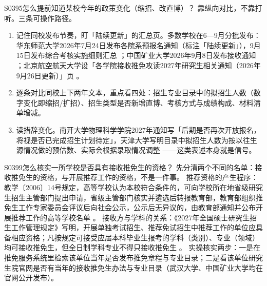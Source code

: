\begin{qa}{S0395}{怎么提前知道某校今年的政策变化（缩招、改直博）？}
靠纵向对比，不靠打听。三条可操作路径。
\begin{enumerate}
  \item 记住同校发布节奏，盯「陆续更新」的汇总页。多数学校在6—9月分批发布：华东师范大学2026年7月24日发布各院系预报名通知（标注「陆续更新」），9月15日发布综合考核实施细则汇总 ；中国矿业大学2026年9月8日发布接收通知 ；北京航空航天大学设「各学院接收推免攻读2027年研究生相关通知（2026年9月26日更新）」页 。
  \item 逐条对比同校上下两年文本，重点看四处：招生专业目录中的拟招生人数（数字变化即缩招/扩招）、招生类型是否新增直博、考核方式与成绩构成、材料清单增减。
  \item 读措辞变化。南开大学物理科学学院2027年通知写「后期是否再次开放报名，将视是否已完成招生计划待定」，天津大学写明目录中拟招生人数为按以往生源情况做的预估数、实际会根据录取情况调整 ——这类表述本身就是信号。
\end{enumerate}
\end{qa}

\begin{qa}{S0399}{怎么核实一所学校是否具有接收推免生的资格？}
先分清两个不同的名单：接收推免生的资格，与开展推荐工作的资格，不是一件事。
推荐资格的产生程序：教学〔2006〕14号规定，高等学校认为本校符合条件的，可向学校所在地省级研究生招生主管部门提出申请，省级主管部门核实并遴选后转报教育部，教育部组织推免生工作专家委员会评议后向社会公示，公示后无异议的，由教育部通知并公布开展推荐工作的高等学校名单 。
接收方与学科的关系：《2027年全国硕士研究生招生工作管理规定》写明，开展单独考试招生、推荐免试招生中推荐工作的单位应具备相应资格；凡按规定可接受应届本科毕业生报考的学科（类别）、专业（领域）均可接收推免生，但全日制学科专业不得只接收推免生 。
实操核实两步：一是在推免服务系统里检索该单位当年是否发布推免章程与专业目录；二是看该单位研究生院官网是否有当年的接收推免生办法与专业目录（武汉大学、中国矿业大学均在官网公开发布）。
\end{qa}

